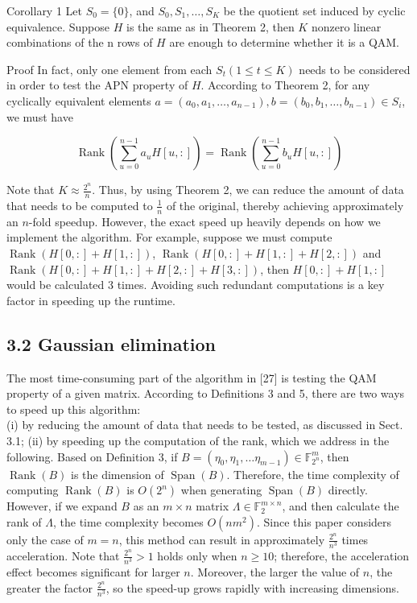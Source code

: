 \documentclass[10pt]{article}
\begin{document}
Corollary 1 Let $S_{0}=\{0\}$, and $S_{0}, S_{1}, \ldots, S_{K}$ be the quotient set induced by cyclic equivalence. Suppose $H$ is the same as in Theorem 2, then $K$ nonzero linear combinations of the n rows of $H$ are enough to determine whether it is a QAM.

Proof In fact, only one element from each $S_{t}(1 \leq t \leq K)$ needs to be considered in order to test the APN property of $H$. According to Theorem 2, for any cyclically equivalent elements $a=\left(a_{0}, a_{1}, \ldots, a_{n-1}\right), b=\left(b_{0}, b_{1}, \ldots, b_{n-1}\right) \in S_{i}$, we must have

$$
\operatorname{Rank}\left(\sum_{u=0}^{n-1} a_{u} H[u,:]\right)=\operatorname{Rank}\left(\sum_{u=0}^{n-1} b_{u} H[u,:]\right)
$$

Note that $K \approx \frac{2^{n}}{n}$. Thus, by using Theorem 2, we can reduce the amount of data that needs to be computed to $\frac{1}{n}$ of the original, thereby achieving approximately an $n$-fold speedup. However, the exact speed up heavily depends on how we implement the algorithm. For example, suppose we must compute $\operatorname{Rank}(H[0,:]+H[1,:])$, $\operatorname{Rank}(H[0,:]+H[1,:]+H[2,:])$ and $\operatorname{Rank}(H[0,:]+H[1,:]+H[2,:]+H[3,:])$, then $H[0,:]+H[1,:]$ would be calculated 3 times. Avoiding such redundant computations is a key factor in speeding up the runtime.

\subsection*{3.2 Gaussian elimination}
The most time-consuming part of the algorithm in [27] is testing the QAM property of a given matrix. According to Definitions 3 and 5, there are two ways to speed up this algorithm:\\
(i) by reducing the amount of data that needs to be tested, as discussed in Sect. 3.1; (ii) by speeding up the computation of the rank, which we address in the following. Based on Definition 3, if $B=\left(\eta_{0}, \eta_{1}, \ldots \eta_{m-1}\right) \in \mathbb{F}_{2^{n}}^{m}$, then $\operatorname{Rank}(B)$ is the dimension of $\operatorname{Span}(B)$. Therefore, the time complexity of computing $\operatorname{Rank}(B)$ is $O\left(2^{n}\right)$ when generating $\operatorname{Span}(B)$ directly. However, if we expand $B$ as an $m \times n$ matrix $\Lambda \in \mathbb{F}_{2}^{m \times n}$, and then calculate the rank of $\Lambda$, the time complexity becomes $O\left(n m^{2}\right)$. Since this paper considers only the case of $m=n$, this method can result in approximately $\frac{2^{n}}{n^{3}}$ times acceleration. Note that $\frac{2^{n}}{n^{3}}>1$ holds only when $n \geq 10$; therefore, the acceleration effect becomes significant for larger $n$. Moreover, the larger the value of $n$, the greater the factor $\frac{2^{n}}{n^{3}}$, so the speed-up grows rapidly with increasing dimensions.
\end{document}
